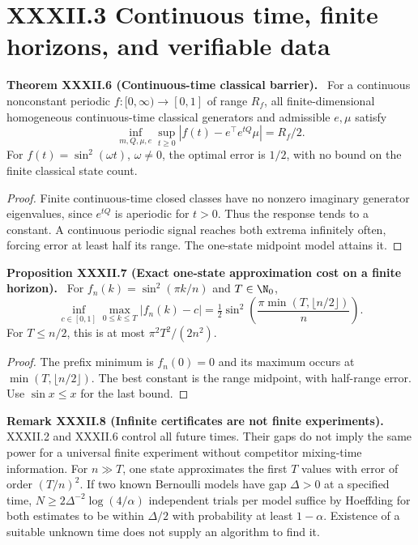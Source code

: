\documentclass[11pt,a4paper,oneside]{book}
\newcommand{\statement}[3]{\par\medskip\noindent\textbf{#1 #2 (#3).}\ }
\begin{document}
\section*{XXXII.3 Continuous time, finite horizons, and verifiable data}
\statement{Theorem}{XXXII.6}{Continuous-time classical barrier} For a continuous nonconstant periodic $f:[0,\infty)\to[0,1]$ of range $R_f$, all finite-dimensional homogeneous continuous-time classical generators and admissible $e,\mu$ satisfy
\begin{equation}\inf_{m,Q,\mu,e}\sup_{t\ge0}|f(t)-e^\top e^{tQ}\mu|=R_f/2.\tag{117}\end{equation}
For $f(t)=\sin^2(\omega t)$, $\omega\ne0$, the optimal error is $1/2$, with no bound on the finite classical state count.
\begin{proof}Finite continuous-time closed classes have no nonzero imaginary generator eigenvalues, since $e^{tQ}$ is aperiodic for $t>0$. Thus the response tends to a constant. A continuous periodic signal reaches both extrema infinitely often, forcing error at least half its range. The one-state midpoint model attains it.\end{proof}
\statement{Proposition}{XXXII.7}{Exact one-state approximation cost on a finite horizon} For $f_n(k)=\sin^2(\pi k/n)$ and $T\in\N_0$,
\begin{equation}\inf_{c\in[0,1]}\max_{0\le k\le T}|f_n(k)-c|=\tfrac12\sin^2\left(\frac{\pi\min(T,\lfloor n/2\rfloor)}n\right).\tag{118}\end{equation}
For $T\le n/2$, this is at most $\pi^2T^2/(2n^2)$.
\begin{proof}The prefix minimum is $f_n(0)=0$ and its maximum occurs at $\min(T,\lfloor n/2\rfloor)$. The best constant is the range midpoint, with half-range error. Use $\sin x\le x$ for the last bound.\end{proof}
\statement{Remark}{XXXII.8}{Infinite certificates are not finite experiments} XXXII.2 and XXXII.6 control all future times. Their gaps do not imply the same power for a universal finite experiment without competitor mixing-time information. For $n\gg T$, one state approximates the first $T$ values with error of order $(T/n)^2$. If two known Bernoulli models have gap $\Delta>0$ at a specified time, $N\ge2\Delta^{-2}\log(4/\alpha)$ independent trials per model suffice by Hoeffding for both estimates to be within $\Delta/2$ with probability at least $1-\alpha$. Existence of a suitable unknown time does not supply an algorithm to find it.
\end{document}
